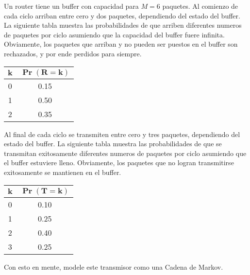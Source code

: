 \documentclass[ a4paper, twoside, 11pt]{article}
\begin{document}
\begin{problem}
Un router tiene un buffer con capacidad para $M = 6$ paquetes. Al comienzo de cada ciclo arriban entre cero y dos paquetes, dependiendo del estado del buffer. La siguiente tabla muestra las probabilidades de que arriben diferentes numeros de paquetes por ciclo asumiendo que la capacidad del buffer fuere infinita. Obviamente, los paquetes que arriban y no pueden ser puestos en el buffer son rechazados, y por ende perdidos para siempre. 

\begin{table}[htb]
\centering
\begin{tabular}{|c|c|}
\hline
$\boldsymbol{k}$ & $\boldsymbol{\Pr( R = k )}$ \\ \hline
0 & 0.15 \\ \hline
1 & 0.50 \\ \hline
2 & 0.35 \\ \hline
\end{tabular}
\end{table}

Al final de cada ciclo se transmiten entre cero y tres paquetes, dependiendo del estado del buffer. La siguiente tabla muestra las probabilidades de que se transmitan exitosamente diferentes numeros de paquetes por ciclo asumiendo que el buffer estuviere lleno. Obviamente, los paquetes que no logran transmitirse exitosamente se mantienen en el buffer. 

\begin{table}[htb]
\centering
\begin{tabular}{|c|c|}
\hline
$\boldsymbol{k}$ & $\boldsymbol{\Pr( T = k )}$ \\ \hline
0 & 0.10 \\ \hline
1 & 0.25 \\ \hline
2 & 0.40 \\ \hline
3 & 0.25 \\ \hline
\end{tabular}
\end{table}

Con esto en mente, modele este transmisor como una Cadena de Markov. \QED

\end{problem}
\end{document}
